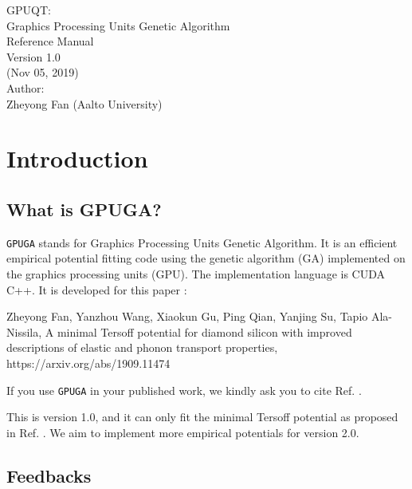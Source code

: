 \documentclass[12pt,a4paper]{report}
\begin{document}
\begin{center}
  \huge
  {
   \vspace*{1.0cm}
   GPUQT: \\
   Graphics Processing Units Genetic Algorithm \\
   \vspace*{1.0cm}
   Reference Manual\\
   \vspace*{1.0cm}
   Version 1.0 \\
   \vspace*{1.0cm}
   (Nov 05, 2019)\\
  \vspace*{2.0cm}
  }
  \large
  {
  Author: \\
  Zheyong Fan (Aalto University)\\
  }
  \vspace*{1.0cm}
\end{center}

\tableofcontents

\chapter{Introduction\label{chapter:introduction}}

\section{What is GPUGA?}

\verb"GPUGA" stands for Graphics Processing Units Genetic Algorithm. It is an efficient empirical potential fitting code using the genetic algorithm (GA) implemented on the graphics processing units (GPU). The implementation language is CUDA C++. It is developed for this paper \cite{fan2019arxiv}:

Zheyong Fan, Yanzhou Wang, Xiaokun Gu, Ping Qian, Yanjing Su, Tapio Ala-Nissila, A minimal Tersoff potential for diamond silicon with improved descriptions of elastic and phonon transport properties, https://arxiv.org/abs/1909.11474

If you use \verb"GPUGA" in your published work, we kindly ask you to cite Ref. \cite{fan2019arxiv}.

This is version 1.0, and it can only fit the minimal Tersoff potential as proposed in Ref. \cite{fan2019arxiv}. We aim to implement more empirical potentials for version 2.0.

\section{Feedbacks}
\end{document}
